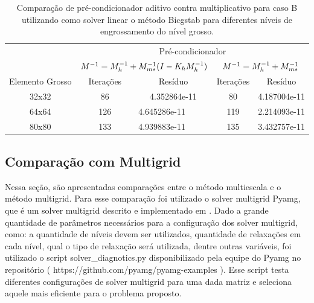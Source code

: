\begin{table}[]
    \caption{Comparação de pré-condicionador aditivo contra multiplicativo para caso B utilizando como solver linear o método Bicgstab para diferentes níveis de engrossamento do nível grosso.}
    \label{table:precondcasoBcomp}
    \begin{tabular}{c|c|l|c|l|}
    \cline{2-5}
                                          & \multicolumn{4}{c|}{Pré-condicionador}                                                        \\ \cline{2-5} 
                                          & \multicolumn{2}{c|}{$M^{-1}=M^{-1}_{h} + M^{-1}_{ms}(I-K_hM^{-1}_{h})$}               & \multicolumn{2}{c|}{$M^{-1}=M^{-1}_{h} + M^{-1}_{ms}$}                \\ \hline
    \multicolumn{1}{|c|}{Elemento Grosso} & Iterações & \multicolumn{1}{c|}{Resíduo}      & Iterações & \multicolumn{1}{c|}{Resíduo}      \\ \hline
    \multicolumn{1}{|c|}{32x32}           & 86        & \multicolumn{1}{c|}{4.352864e-11} & 80        & \multicolumn{1}{c|}{4.187004e-11} \\ \hline
    \multicolumn{1}{|c|}{64x64}           & 126       & 4.645286e-11                      & 119       & 2.214093e-11                      \\ \hline
    \multicolumn{1}{|c|}{80x80}           & 133       & 4.939883e-11                      & 135       & 3.432757e-11                      \\ \hline
    \end{tabular}
\end{table}


\subsection{Comparação com Multigrid}

Nessa seção, são apresentadas comparações entre o método multiescala e o método multigrid. Para esse comparação foi utilizado o solver multigrid Pyamg, que é um solver multigrid  descrito e implementado em \cite{OlSc2018}. Dado a grande quantidade de parâmetros necessários para a configuração dos solver multigrid, como: a quantidade de níveis devem ser utilizados, quantidade de relaxações em cada nível, qual o tipo de relaxação será utilizada, dentre outras variáveis, foi utilizado o script solver\_diagnotics.py disponibilizado pela equipe do Pyamg no repositório ( https://github.com/pyamg/pyamg-examples ). Esse script testa diferentes configurações de solver multigrid para uma dada matriz e seleciona aquele mais eficiente para o problema proposto.

